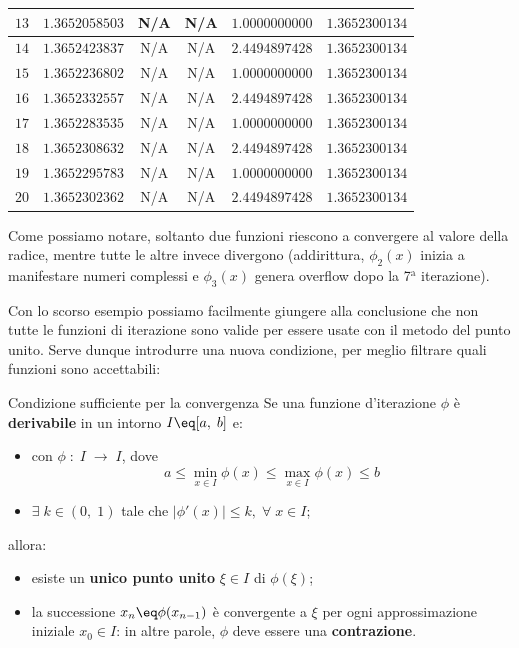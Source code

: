 \begin{example}
\begin{center}
{\begin{tabular}{|c|c|c|c|c|c|}
                $13$ & $1.3652058503$ & N/A & N/A & $1.0000000000$ & $1.3652300134$ \\
                \hline 
                $14$ & $1.3652423837$ & N/A & N/A & $2.4494897428$ & $1.3652300134$ \\
                \hline 
                $15$ & $1.3652236802$ & N/A & N/A & $1.0000000000$ & $1.3652300134$ \\
                \hline 
                $16$ & $1.3652332557$ & N/A & N/A & $2.4494897428$ & $1.3652300134$ \\
                \hline 
                $17$ & $1.3652283535$ & N/A & N/A & $1.0000000000$ & $1.3652300134$ \\
                \hline 
                $18$ & $1.3652308632$ & N/A & N/A & $2.4494897428$ & $1.3652300134$ \\
                \hline 
                $19$ & $1.3652295783$ & N/A & N/A & $1.0000000000$ & $1.3652300134$ \\
                \hline 
                $20$ & $1.3652302362$ & N/A & N/A & $2.4494897428$ & $1.3652300134$ \\
                \hline
            \end{tabular}
        }
    \end{center}

    Come possiamo notare, soltanto due funzioni riescono a convergere al valore della radice, mentre tutte le altre invece divergono (addirittura, $\phi_2(x)$ inizia a manifestare numeri complessi e $\phi_3(x)$ genera overflow dopo la 7$^{\text{a}}$ iterazione).
\end{example}

Con lo scorso esempio possiamo facilmente giungere alla conclusione che non tutte le funzioni di iterazione sono valide per essere usate con il metodo del punto unito. Serve dunque introdurre una nuova condizione, per meglio filtrare quali funzioni sono accettabili:

\begin{theorem}{Condizione sufficiente per la convergenza}
    Se una funzione d'iterazione $\phi$ è \textbf{derivabile} in un intorno $I \eq [a, \; b]$ e:
    \begin{itemize}
        \item con $\phi \; : \; I \; \longrightarrow \; I$, dove
        \[ a \leq \min_{x \in I} \phi(x) \leq \max_{x \in I} \phi(x) \leq b \]
        \item $\exists \; k \in (0, \; 1)$ tale che $|\phi'(x)| \leq k, \; \forall \; x \in I$;
    \end{itemize}

    allora:
    \begin{itemize}
        \item esiste un \textbf{unico punto unito} $\xi \in I$ di $\phi(\xi)$;
        \item la successione $x_n \eq \phi(x_{n - 1})$ è convergente a $\xi$ per ogni approssimazione iniziale $x_0 \in I$: in altre parole, $\phi$ deve essere una \textbf{contrazione}.
    \end{itemize}
\end{theorem}

